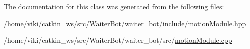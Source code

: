 The documentation for this class was generated from the following files\+:\begin{DoxyCompactItemize}
\item 
/home/viki/catkin\+\_\+ws/src/\+Waiter\+Bot/waiter\+\_\+bot/include/\hyperlink{motionModule_8hpp}{motion\+Module.\+hpp}\item 
/home/viki/catkin\+\_\+ws/src/\+Waiter\+Bot/waiter\+\_\+bot/src/\hyperlink{motionModule_8cpp}{motion\+Module.\+cpp}\end{DoxyCompactItemize}
